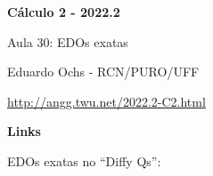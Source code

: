 \documentclass[oneside,12pt]{article}
\begin{document}


\def\u#1{\par{\footnotesize \url{#1}}}

\def\drafturl{http://angg.twu.net/LATEX/2022-2-C2.pdf}
\def\drafturl{http://angg.twu.net/2022.2-C2.html}
\def\draftfooter{\tiny \href{\drafturl}{\jobname{}} \ColorBrown{\shorttoday{} \hours}}



%

\thispagestyle{empty}

\begin{center}

\vspace*{1.2cm}

{\bf \Large Cálculo 2 - 2022.2}

\bsk

Aula 30: EDOs exatas

\bsk

Eduardo Ochs - RCN/PURO/UFF

\url{http://angg.twu.net/2022.2-C2.html}

\end{center}

\newpage


{\bf Links}

\msk

EDOs exatas no ``Diffy Qs'':
\end{document}
